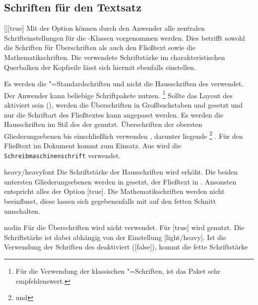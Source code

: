 \subsection{Schriften für den Textsatz}
\begin{Declaration}{[\PSet]}[true]%
\printdeclarationlist%
\label{sec:text}%
%
%
Mit der Option  können durch den Anwender alle zentralen 
Schrifteinstellungen für die \TUDScript-Klassen vorgenommen werden. Dies 
betrifft sowohl die Schriften für Überschriften als auch den Fließtext sowie 
die Mathematikschriften. Die verwendete Schriftstärke im charakteristischen 
Querbalken der Kopfzeile lässt sich hiermit ebenfalls einstellen.
%
\begin{values}
\itemfalse
  Es werden die "=Standardschriften und nicht die Hausschriften 
  des \CDs verwendet. Der Anwender kann beliebige Schriftpakete nutzen.%
  \footnote{%
    Für die Verwendung der klassischen "=Schriften, ist das Paket 
     sehr empfehlenswert.%
  }
  Sollte das Layout des \CDs aktiviert sein (), werden die 
  Überschriften in Großbuchstaben und \DIN gesetzt und nur die Schriftart des 
  Fließtextes kann angepasst werden.
  Es werden die Hausschriften im Stil des \CDs der \TnUD genutzt. Überschriften 
  der obersten Gliederungsebenen bis einschließlich  
  verwenden \DIN, darunter liegende%
  \footnote{ und } 
  . Für den Fließtext im Dokument kommt 
   zum Einsatz. Aus  wird die
  \texttt{Schreibmaschinenschrift} verwendet.
\item[heavy/heavyfont]
  Die Schriftstärke der Hausschriften wird erhöht. Die beiden untersten 
  Gliederungsebenen werden in  gesetzt, der Fließtext 
  in . Ansonsten entspricht alles der Option 
  [true]. Die Mathematikschriften werden nicht beeinflusst, 
  diese lassen sich gegebenenfalls mit  auf den fetten Schnitt 
  umschalten.
\item[nodin]
  Für die Überschriften wird \DIN nicht verwendet. Für [true] 
  wird \Univers genutzt. Die Schriftstärke ist dabei abhängig von der   
  Einstellung [light/heavy]. Ist die Verwendung der Schriften 
  des \CDs deaktiviert ([false]), kommt die fette Schriftstärke 

\end{values}
\end{Declaration}

